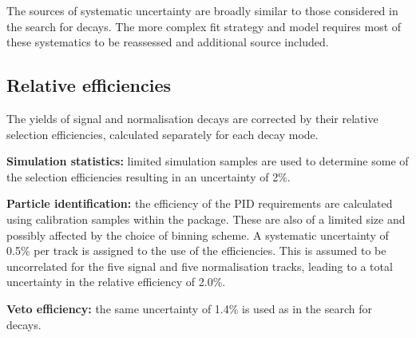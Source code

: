 The sources of systematic uncertainty are broadly similar to those considered in the search for \decay{\Bp}{\Dsp\Kp\Km} decays. The more complex fit strategy and model requires most of these systematics to be reassessed and additional source included. 

\subsection{Relative efficiencies}
The yields of signal and normalisation decays are corrected by their relative selection efficiencies, calculated separately for each \Dsp decay mode. 

\begin{description}
\item \textbf{Simulation statistics:} limited simulation samples are used to determine some of the selection efficiencies resulting in an uncertainty of 2\%. 

\item \textbf{Particle identification:} the efficiency of the PID requirements are calculated using calibration samples within the \pidcalib package. These are also of a limited size and possibly affected by the choice of binning scheme. 
A systematic uncertainty of 0.5\% per track is assigned to the use of the \pidcalib efficiencies. This is assumed to be uncorrelated for the five signal and five normalisation tracks, leading to a total uncertainty in the relative efficiency of 2.0\%. 

\item \textbf{Veto efficiency:} the same uncertainty of 1.4\% is used as in the search for \decay{\Bp}{\Dsp\Kp\Km} decays.


\end{description}
